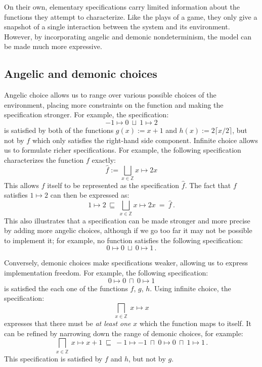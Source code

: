 \documentclass[11pt,oneside]{book}
\theoremstyle{definition}
\newcommand{\refby}{\sqsubseteq} %
\begin{document}
On their own,
elementary specifications
carry limited information about the functions
they attempt to characterize.
Like the plays of a game,
they only give a snapshot of a single
interaction between the system and its environment.
However,
by incorporating angelic and demonic nondeterminism,
the model can be made much more expressive.


\subsection{Angelic and demonic choices} %

Angelic choice allows us to range over
various possible choices of the environment,
placing more constraints on the function and
making the specification stronger.
For example,
the specification:
\[
    -1 \mapsto 0
    \: \sqcup \:
    1 \mapsto 2
\]
is satisfied by both of the functions
$g(x) := x + 1$ and $h(x) := 2 \lceil x / 2 \rceil$,
but not by $f$ which only satisfies the right-hand side component.
Infinite choice allows us to formulate
richer specifications.
For example, the following specification
characterizes the function $f$ exactly:
\[
  \hat{f} := \bigsqcup_{x \in \mathbb{Z}} x \mapsto 2x
\]
This allows $f$ itself to be represented as the specification $\hat{f}$.
The fact that $f$ satisfies $1 \mapsto 2$ can then be expressed as:
\[
  1 \mapsto 2
  \: \sqsubseteq \:
  \bigsqcup_{x \in \mathbb{Z}} x \mapsto 2x
  \: = \:
  \hat{f}
  \,.
\]
This also illustrates that
a specification can be made stronger
and more precise by adding more angelic choices,
although if we go too far it may not be possible to implement it;
for example, no function satisfies
the following specification:
\[
  0 \mapsto 0 \: \sqcup \: 0 \mapsto 1
  \,.
\]

Conversely,
demonic choices
make specifications weaker,
allowing us to express implementation freedom.
For example, the following specification:
\[
    0 \mapsto 0 \: \sqcap \: 0 \mapsto 1
\]
is satisfied the each one of the functions $f$, $g$, $h$.
Using infinite choice,
the specification:
\[
    \bigsqcap_{x \in \mathbb{Z}} \: x \mapsto x
\]
expresses that there must be \emph{at least one} $x$
which the function maps to itself.
It can be refined by narrowing down the range
of demonic choices, for example:
\[
  \bigsqcap_{x \in \mathbb{Z}} \: x \mapsto x + 1
  \: \refby \:
  -1 \mapsto -1
  \: \sqcap \:
  0 \mapsto 0
  \: \sqcap \:
  1 \mapsto 1
  \,.
\]
This specification is satisfied by $f$ and $h$,
but not by $g$.
\end{document}
